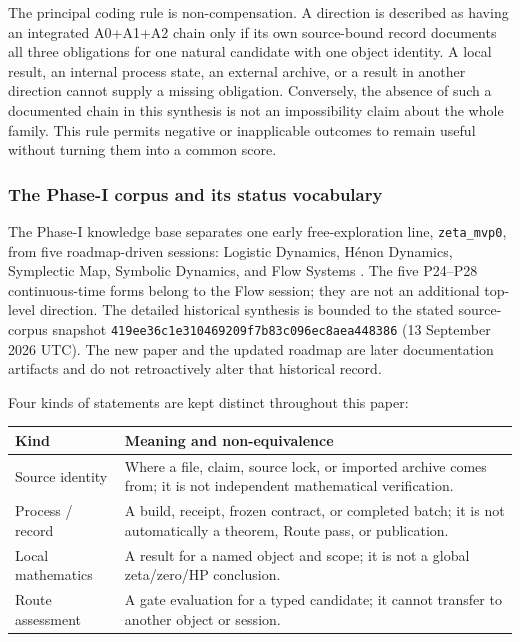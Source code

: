 The principal coding rule is non-compensation. A direction is described as
having an integrated A0+A1+A2 chain only if its own source-bound record
documents all three obligations for one natural candidate with one object
identity. A local result, an internal process state, an external archive, or a
result in another direction cannot supply a missing obligation. Conversely,
the absence of such a documented chain in this synthesis is not an
impossibility claim about the whole family. This rule permits negative or
inapplicable outcomes to remain useful without turning them into a common
score.

\subsubsection{The Phase-I corpus and its status vocabulary}

The Phase-I knowledge base separates one early free-exploration line,
\texttt{zeta\_mvp0}, from five roadmap-driven sessions: Logistic Dynamics,
H\'{e}non Dynamics, Symplectic Map, Symbolic Dynamics, and Flow Systems
\citep{PhaseIRepository}. The five P24--P28 continuous-time forms belong to
the Flow session; they are not an additional top-level direction. The detailed
historical synthesis is bounded to the stated source-corpus snapshot
\texttt{419ee36c1e310469209f7b83c096ec8aea448386} (13 September 2026 UTC).
The new paper and the updated roadmap are later documentation artifacts and do
not retroactively alter that historical record.

Four kinds of statements are kept distinct throughout this paper:

\begin{center}
\small
\begin{tabularx}{\linewidth}{@{}p{.21\linewidth}Y@{}}
\toprule
\textbf{Kind} & \textbf{Meaning and non-equivalence} \\
\midrule
Source identity & Where a file, claim, source lock, or imported archive comes
from; it is not independent mathematical verification. \\
Process / record & A build, receipt, frozen contract, or completed batch;
it is not automatically a theorem, Route pass, or publication. \\
Local mathematics & A result for a named object and scope; it is not a global
zeta/zero/HP conclusion. \\
Route assessment & A gate evaluation for a typed candidate; it cannot transfer
to another object or session. \\
\bottomrule
\end{tabularx}
\end{center}

